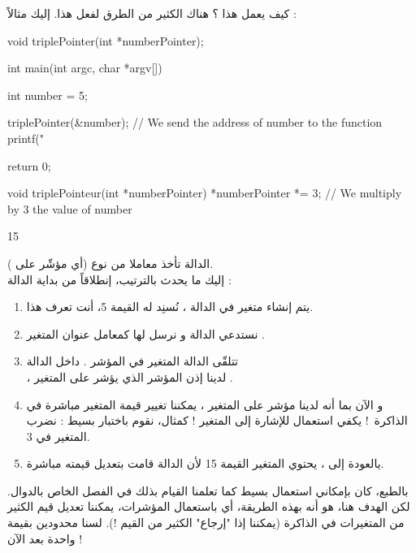 كيف يعمل هذا ؟ هناك الكثير من الطرق لفعل هذا. إليك مثالاً :
\begin{Csource}
void triplePointer(int *numberPointer);

int main(int argc, char *argv[])
{
	int number = 5;

	triplePointer(&number); // We send the address of number to the function
	printf("%

	return 0;
}

void triplePointeur(int *numberPointer)
{
	*numberPointer *= 3; // We multiply by 3 the value of number
}
\end{Csource}
\begin{Console}
15
\end{Console}
الدالة
تأخذ معاملا من نوع
(أي مؤشّر على
).\\
إليك ما يحدث بالترتيب، إنطلاقاً من بداية الدالة
 :
\begin{enumerate}
	\item يتم إنشاء متغير
في الدالة
،
نُسنِد له القيمة 5، أنت تعرف هذا.
	\item نستدعي الدالة
و نرسل لها كمعامل عنوان المتغير
.
	\item تتلقّى الدالة
المتغير في المؤشر
.
داخل الدالة\\
،
لدينا إذن المؤشر
الذي يؤشر على المتغير
.
	\item و الآن بما أنه لدينا مؤشر على المتغير
،
يمكننا تغيير قيمة المتغير
مباشرة في الذاكرة~! يكفي استعمال
للإشارة إلى المتغير
 !
كمثال، نقوم باختبار بسيط : نضرب المتغير في 3.
	\item يالعودة إلى
،
يحتوي المتغير
القيمة 15 لأن الدالة
قامت بتعديل قيمته مباشرة.
\end{enumerate}

بالطبع، كان بإمكاني استعمال
بسيط كما تعلمنا القيام بذلك في الفصل الخاص بالدوال. لكن الهدف هنا، هو أنه بهذه الطريقة، أي باستعمال المؤشرات، يمكننا تعديل قيم الكثير من المتغيرات في الذاكرة (يمكننا إذا "إرجاع" الكثير من القيم !). لسنا محدودين بقيمة واحدة بعد الآن !

